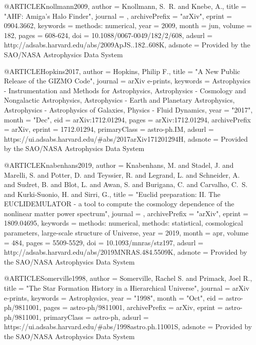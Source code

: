{@ARTICLE{Knollmann2009,
   author = {{Knollmann}, S.~R. and {Knebe}, A.},
    title = "{AHF: Amiga's Halo Finder}",
  journal = {\apjs},
archivePrefix = "arXiv",
   eprint = {0904.3662},
 keywords = {methods: numerical},
     year = 2009,
    month = jun,
   volume = 182,
    pages = {608-624},
      doi = {10.1088/0067-0049/182/2/608},
   adsurl = {http://adsabs.harvard.edu/abs/2009ApJS..182..608K},
  adsnote = {Provided by the SAO/NASA Astrophysics Data System}
}

@ARTICLE{Hopkins2017,
       author = {{Hopkins}, Philip F.},
        title = "{A New Public Release of the GIZMO Code}",
      journal = {arXiv e-prints},
     keywords = {Astrophysics - Instrumentation and Methods for Astrophysics, Astrophysics - Cosmology and Nongalactic Astrophysics, Astrophysics - Earth and Planetary Astrophysics, Astrophysics - Astrophysics of Galaxies, Physics - Fluid Dynamics},
         year = "2017",
        month = "Dec",
          eid = {arXiv:1712.01294},
        pages = {arXiv:1712.01294},
archivePrefix = {arXiv},
       eprint = {1712.01294},
 primaryClass = {astro-ph.IM},
       adsurl = {https://ui.adsabs.harvard.edu/\#abs/2017arXiv171201294H},
      adsnote = {Provided by the SAO/NASA Astrophysics Data System}
}


@ARTICLE{Knabenhans2019,
   author = {{Knabenhans}, M. and {Stadel}, J. and {Marelli}, S. and {Potter}, D. and 
	{Teyssier}, R. and {Legrand}, L. and {Schneider}, A. and {Sudret}, B. and 
	{Blot}, L. and {Awan}, S. and {Burigana}, C. and {Carvalho}, C.~S. and 
	{Kurki-Suonio}, H. and {Sirri}, G.},
    title = "{Euclid preparation: II. The EUCLIDEMULATOR - a tool to compute the cosmology dependence of the nonlinear matter power spectrum}",
  journal = {\mnras},
archivePrefix = "arXiv",
   eprint = {1809.04695},
 keywords = {methods: numerical, methods: statistical, cosmological parameters, large-scale structure of Universe},
     year = 2019,
    month = apr,
   volume = 484,
    pages = {5509-5529},
      doi = {10.1093/mnras/stz197},
   adsurl = {http://adsabs.harvard.edu/abs/2019MNRAS.484.5509K},
  adsnote = {Provided by the SAO/NASA Astrophysics Data System}
}

@ARTICLE{Somerville1998,
       author = {{Somerville}, Rachel S. and {Primack}, Joel R.},
        title = "{The Star Formation History in a Hierarchical Universe}",
      journal = {arXiv e-prints},
     keywords = {Astrophysics},
         year = "1998",
        month = "Oct",
          eid = {astro-ph/9811001},
        pages = {astro-ph/9811001},
archivePrefix = {arXiv},
       eprint = {astro-ph/9811001},
 primaryClass = {astro-ph},
       adsurl = {https://ui.adsabs.harvard.edu/\#abs/1998astro.ph.11001S},
      adsnote = {Provided by the SAO/NASA Astrophysics Data System}
}

}
